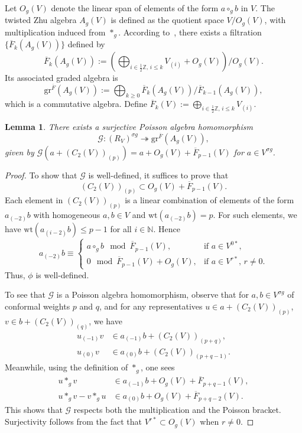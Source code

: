 \documentclass[9pt]{amsart}
\newtheorem{lemma}{Lemma}[section]
\begin{document}
Let $O_g(V)$ denote the linear span of elements of the form $a \circ_g b$ in $V$. The twisted Zhu algebra $A_g(V)$ is defined as the quotient space $V / O_g(V)$, with multiplication induced from $*_g$. According to~\cite{de2006finite}, there exists a filtration $\{\overline{F}_k(A_g(V))\}$ defined by
\[
\overline{F}_k(A_g(V)) := \left( \bigoplus_{i \in \frac{1}{2} \mathbb{Z},\, i \leq k} V_{(i)} + O_g(V) \right) / O_g(V).
\]
Its associated graded algebra is
\[
\mathrm{gr}^{\overline{F}}(A_g(V)) := \bigoplus_{k \geq 0} \overline{F}_k(A_g(V)) / \overline{F}_{k-1}(A_g(V)),
\]
which is a commutative algebra. Define $\overline{F}_k(V) := \bigoplus_{i \in \frac{1}{2} \mathbb{Z},\, i \leq k} V_{(i)}$.

\begin{lemma}\label{epi}
There exists a surjective Poisson algebra homomorphism
\[
\mathcal{G}: (R_V)^{\sigma g} \twoheadrightarrow \mathrm{gr}^{\overline{F}}(A_g(V)),
\]
given by $\mathcal{G}(a + (C_2(V))_{(p)}) = a + O_g(V) + \overline{F}_{p-1}(V)$ for $a \in V^{\sigma g}$.
\end{lemma}

\begin{proof}
To show that $\mathcal{G}$ is well-defined, it suffices to prove that
\[
(C_2(V))_{(p)} \subset O_g(V) + \overline{F}_{p-1}(V).
\]
Each element in $(C_2(V))_{(p)}$ is a linear combination of elements of the form $a_{(-2)} b$ with homogeneous $a, b \in V$ and $\mathrm{wt}(a_{(-2)} b) = p$. For such elements, we have $\mathrm{wt}(a_{(i-2)} b) \leq p - 1$ for all $i \in \mathbb{N}$. Hence
\[
a_{(-2)} b \equiv 
\begin{cases}
a \circ_g b \mod \overline{F}_{p-1}(V), & \text{if } a \in V^{0*}, \\
0 \mod \overline{F}_{p-1}(V) + O_g(V), & \text{if } a \in V^{r*},\, r \neq 0.
\end{cases}
\]
Thus, $\phi$ is well-defined.

To see that $\mathcal{G}$ is a Poisson algebra homomorphism, observe that for $a, b \in V^{\sigma g}$ of conformal weights $p$ and $q$, and for any representatives $u \in a + (C_2(V))_{(p)}$, $v \in b + (C_2(V))_{(q)}$, we have
\begin{align*}
u_{(-1)} v &\in a_{(-1)} b + (C_2(V))_{(p+q)}, \\
u_{(0)} v &\in a_{(0)} b + (C_2(V))_{(p+q-1)}.
\end{align*}
Meanwhile, using the definition of $*_g$, one sees
\begin{align*}
u *_g v &\in a_{(-1)} b + O_g(V) + \overline{F}_{p+q-1}(V), \\
u *_g v - v *_g u &\in a_{(0)} b + O_g(V) + \overline{F}_{p+q-2}(V).
\end{align*}
This shows that $\mathcal{G}$ respects both the multiplication and the Poisson bracket. Surjectivity follows from the fact that $V^{r*} \subset O_g(V)$ when $r \neq 0$.
\end{proof}
\end{document}
